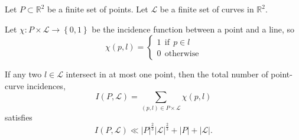 \documentclass[12pt,reqno]{amsart}
\begin{document}
\begin{theorem}
Let \(P \subset \mathbb{R} ^{2}\) be a finite set of points. Let \(\mathcal{L} \) be a finite set of curves in \(\mathbb{R} ^{2}\). 

Let \(\chi : P \times \mathcal{L}  \to \left\{ 0,1 \right\} \) be the incidence function
between a point and a line, so
\[
\chi(p,l) = 
\begin{cases}
1 ~ ~ \text{if} ~ ~ p\in l\\
0 ~ ~ \text{otherwise} 
\end{cases}
\]

If any two \( l \in \mathcal{L} \) intersect in at most one point,
then the total number of point-curve incidences,
\[
    I(P, \mathcal{L} ) = \sum _{(p,l)\in P \times \mathcal{L} } \chi(p,l)
\]
satisfies
\[
    I(P,\mathcal{L} ) \ll  \left\lvert P \right\rvert^{\frac{2}{3} } \left\lvert \mathcal{L}  \right\rvert ^{\frac{2}{3} } + \left\lvert P \right\rvert + \left\lvert \mathcal{L}  \right\rvert 
.\]
\end{theorem}
\end{document}
